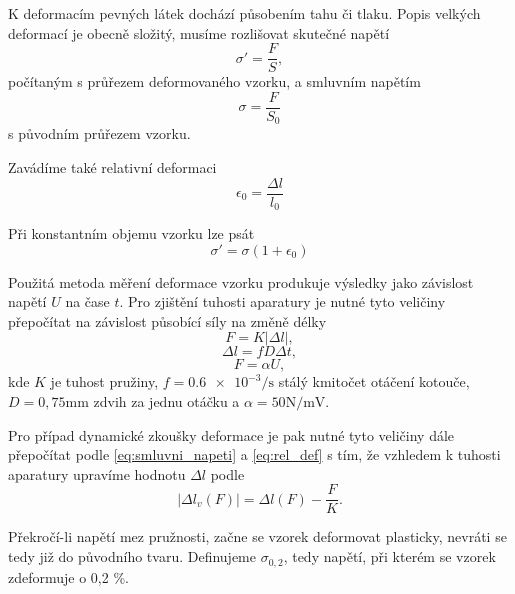 \documentclass[protokol.tex]{subfiles}
\begin{document}
K deformacím pevných látek dochází působením tahu či tlaku. Popis velkých deformací je obecně složitý, musíme rozlišovat skutečné napětí \cite{stud_text}
\begin{equation}
\sigma' = \frac{F}{S},
\end{equation} 
počítaným s průřezem deformovaného vzorku, a smluvním napětím \cite{stud_text}
\begin{equation} \label{eq:smluvni_napeti}
\sigma = \frac{F}{S_0}
\end{equation}
s původním průřezem vzorku.

Zavádíme také relativní deformaci \cite{stud_text}
\begin{equation} \label{eq:rel_def}
\epsilon_0 = \frac{\Delta l}{l_0}
\end{equation}

Při konstantním objemu vzorku lze psát \cite{stud_text}
\begin{equation}
\sigma' = \sigma (1 + \epsilon_0)
\end{equation}

Použitá metoda měření deformace vzorku produkuje výsledky jako závislost napětí $U$ na čase $t$. Pro zjištění tuhosti aparatury je nutné tyto veličiny přepočítat na závislost působící síly na změně délky \cite{stud_text}
\begin{equation} \label{eq:tuhost}
F = K | \Delta l |,
\end{equation}
\begin{equation}
\Delta l = f D \Delta t,
\end{equation}
\begin{equation}
F = \alpha U,
\end{equation}
kde $K$ je tuhost pružiny, $f = \num{0.6e-3} \si{\per\second}$ stálý kmitočet otáčení kotouče, $D = 0,75 \si{\milli\metre}$ zdvih za jednu otáčku a $\alpha = 50 \si{\newton\per\milli\volt}$.

Pro případ dynamické zkoušky deformace je pak nutné tyto veličiny dále přepočítat podle \eqref{eq:smluvni_napeti} a \eqref{eq:rel_def} s tím, že vzhledem k tuhosti aparatury upravíme hodnotu $\Delta l$ podle \cite{stud_text}
\begin{equation}
|\Delta l_v (F)| = \Delta l(F) - \frac{F}{K}.
\end{equation}

Překročí-li napětí mez pružnosti, začne se vzorek deformovat plasticky, nevráti se tedy již do původního tvaru. Definujeme $\sigma_{0,2}$, tedy napětí, při kterém se vzorek zdeformuje o 0,2 \%.
\end{document}
